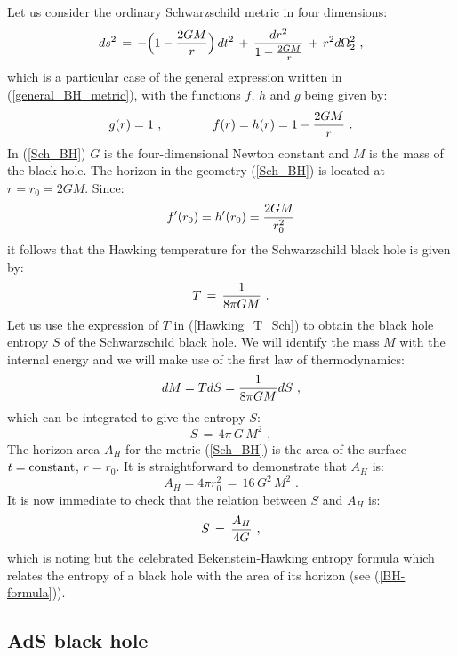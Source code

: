 \documentclass[12pt,notitlepage]{article}
\newcommand{\beq}{\begin{equation}}
\newcommand{\eeq}{\end{equation}}
\begin{document}
Let us consider the  ordinary Schwarzschild  metric in four dimensions:
\beq
ds^2\,=\,-\Big(1-{2GM\over r}\Big)\,dt^2\,+\,{dr^2\over 1-{2GM\over r}}\,+\,
r^2 d\Omega_2^2\,\,,
\label{Sch_BH}
\eeq
which is a particular case  of the general  expression written in (\ref{general_BH_metric}),  with the functions $f$, $h$ and $g$ being given by:
\beq
g(r)=1\,\,,
\qquad\qquad
f(r)=h(r)=1-{2GM\over r}\,\,.
\eeq
In (\ref{Sch_BH}) $G$ is the four-dimensional Newton constant and $M$ is the mass of the black hole. The horizon in the geometry (\ref{Sch_BH}) is located at $r=r_0=2 GM$. Since:
\beq
f'(r_0)=h'(r_0)={2GM\over r_0^2}
\eeq
it follows that the Hawking temperature for the  Schwarzschild black hole is given by:
\beq
T\,=\,{1\over 8\pi G M}\,\,.
\label{Hawking_T_Sch}
\eeq
Let us use the expression of $T$  in (\ref{Hawking_T_Sch}) to obtain the black hole entropy $S$ of the Schwarzschild black hole. We will identify the mass $M$ with the internal energy and we  will make use of the first law of thermodynamics:
\beq
dM=T dS={1\over  8\pi G M} dS\,\,,
\eeq
which can be integrated to give  the entropy $S$:
\beq
S\,=\,4\pi\,G\,M^2\,\,,
\eeq
The horizon area $A_H$  for the metric (\ref{Sch_BH}) is the area of the surface $t={\rm constant}$, $r=r_0$. It is straightforward to demonstrate that $A_H$ is:
\beq
A_H=4\pi r_0^2\,=\,16\,G^2\,M^2\,\,.
\eeq
It is now immediate to check that the relation between $S$ and $A_H$ is:
\beq
S\,=\,{A_H\over 4 G}\,\,,
\eeq
which is noting but the celebrated Bekenstein-Hawking entropy formula which relates the entropy of a black hole with the area of its horizon (see (\ref{BH-formula})). 

\subsection {AdS black hole}
\label{section_AdS_BH}
\end{document}
